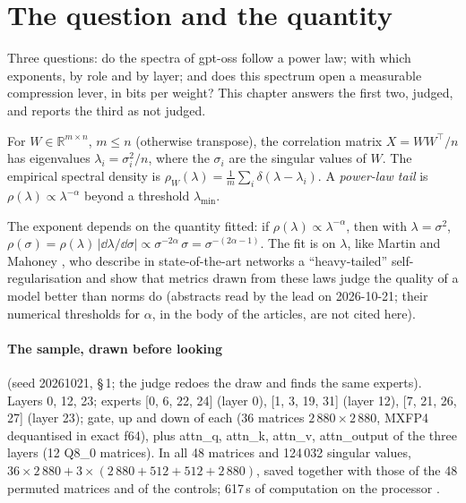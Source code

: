 \section{The question and the quantity}\label{t3spe:sec:grandeur}

Three questions: do the spectra of gpt-oss follow a power law; with which exponents, by role and by layer; and does this spectrum open a measurable compression lever, in bits per weight? This chapter answers the first two, judged, and reports the third as not judged.

\begin{definition}\label{t3spe:def:esd}
For $W \in \mathbb{R}^{m \times n}$, $m \le n$ (otherwise transpose), the correlation matrix $X = WW^\top/n$ has eigenvalues $\lambda_i = \sigma_i^2/n$, where the $\sigma_i$ are the singular values of $W$. The empirical spectral density is $\rho_W(\lambda) = \frac1m\sum_i \delta(\lambda - \lambda_i)$. A \emph{power-law tail} is $\rho(\lambda) \propto \lambda^{-\alpha}$ beyond a threshold $\lambda_{\min}$.
\end{definition}
The exponent depends on the quantity fitted: if $\rho(\lambda) \propto \lambda^{-\alpha}$, then with $\lambda = \sigma^2$, $\rho(\sigma) = \rho(\lambda)\,|\dd\lambda/\dd\sigma| \propto \sigma^{-2\alpha}\,\sigma = \sigma^{-(2\alpha - 1)}$. The fit is on $\lambda$, like Martin and Mahoney \cite{martin2018implicit,martin2021predicting}, who describe in state-of-the-art networks a ``heavy-tailed'' self-regularisation and show that metrics drawn from these laws judge the quality of a model better than norms do (abstracts read by the lead on 2026-10-21; their numerical thresholds for $\alpha$, in the body of the articles, are not cited here).

\paragraph{The sample, drawn before looking} (seed 20261021,  §\,1; the judge redoes the draw and finds the same experts). Layers 0, 12, 23; experts [0, 6, 22, 24] (layer 0), [1, 3, 19, 31] (layer 12), [7, 21, 26, 27] (layer 23); gate, up and down of each (36 matrices $2\,880 \times 2\,880$, MXFP4 dequantised in exact f64), plus attn\_q, attn\_k, attn\_v, attn\_output of the three layers (12 Q8\_0 matrices). In all 48 matrices and 124\,032 singular values, $36 \times 2\,880 + 3 \times (2\,880 + 512 + 512 + 2\,880)$, saved together with those of the 48 permuted matrices and of the controls; 617\,s of computation on the processor \mes.

